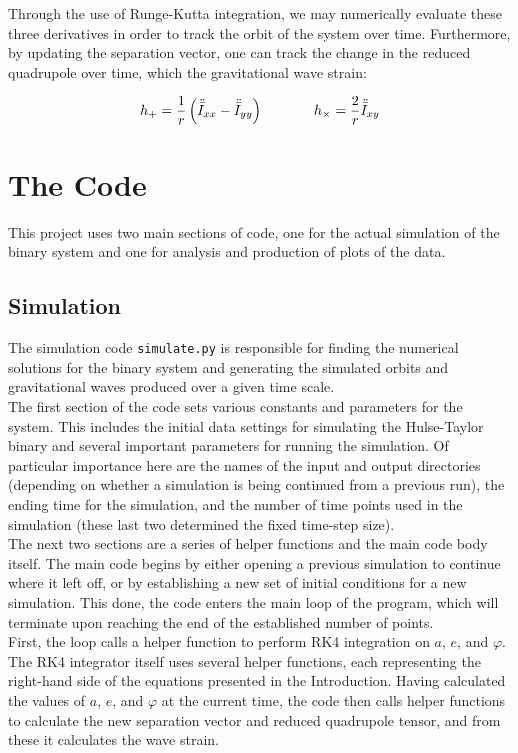 \documentclass[11pt,letterpaper]{article}
\begin{document}
Through the use of Runge-Kutta integration, we may numerically evaluate these three derivatives in order to track the orbit of the system over time. Furthermore, by updating the separation vector, one can track the change in the reduced quadrupole over time, which the gravitational wave strain:

$$ h_+ = \frac{1}{r} \left( \ddot{\bar{I}}_{xx} - \ddot{\bar{I}}_{yy} \right) \hspace*{.5in} h_{\times} = \frac{2}{r} \ddot{\bar{I}}_{xy} $$

\section{The Code}

This project uses two main sections of code, one for the actual simulation of the binary system and one for analysis and production of plots of the data.

\subsection{Simulation}

The simulation code \texttt{simulate.py} is responsible for finding the numerical solutions for the binary system and generating the simulated orbits and gravitational waves produced over a given time scale. \\

The first section of the code sets various constants and parameters for the system. This includes the initial data settings for simulating the Hulse-Taylor binary and several important parameters for running the simulation. Of particular importance here are the names of the input and output directories (depending on whether a simulation is being continued from a previous run), the ending time for the simulation, and the number of time points used in the simulation (these last two determined the fixed time-step size). \\

The next two sections are a series of helper functions and the main code body itself. The main code begins by either opening a previous simulation to continue where it left off, or by establishing a new set of initial conditions for a new simulation. This done, the code enters the main loop of the program, which will terminate upon reaching the end of the established number of points. \\

First, the loop calls a helper function to perform RK4 integration on $a$, $e$, and $\varphi$. The RK4 integrator itself uses several helper functions, each representing the right-hand side of the equations presented in the Introduction. Having calculated the values of $a$, $e$, and $\varphi$ at the current time, the code then calls helper functions to calculate the new separation vector and reduced quadrupole tensor, and from these it calculates the wave strain. \\
\end{document}
